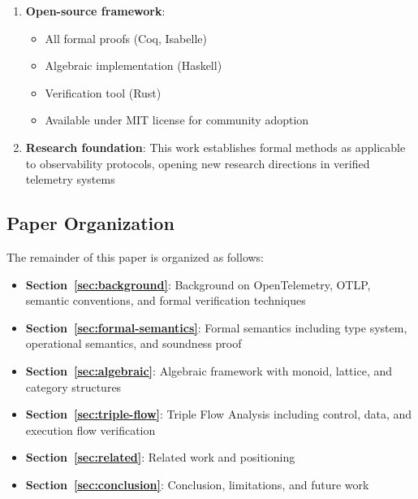 \begin{enumerate}
\item \textbf{Open-source framework}:
  \begin{itemize}
  \item All formal proofs (Coq, Isabelle)
  \item Algebraic implementation (Haskell)
  \item Verification tool (Rust)
  \item Available under MIT license for community adoption
  \end{itemize}

\item \textbf{Research foundation}: This work establishes formal methods as applicable to observability protocols, opening new research directions in verified telemetry systems
\end{enumerate}

\subsection{Paper Organization}
\label{sec:organization}

The remainder of this paper is organized as follows:

\begin{itemize}
\item \textbf{Section~\ref{sec:background}}: Background on OpenTelemetry, OTLP, semantic conventions, and formal verification techniques
\item \textbf{Section~\ref{sec:formal-semantics}}: Formal semantics including type system, operational semantics, and soundness proof
\item \textbf{Section~\ref{sec:algebraic}}: Algebraic framework with monoid, lattice, and category structures
\item \textbf{Section~\ref{sec:triple-flow}}: Triple Flow Analysis including control, data, and execution flow verification
\item \textbf{Section~\ref{sec:related}}: Related work and positioning
\item \textbf{Section~\ref{sec:conclusion}}: Conclusion, limitations, and future work
\end{itemize}
